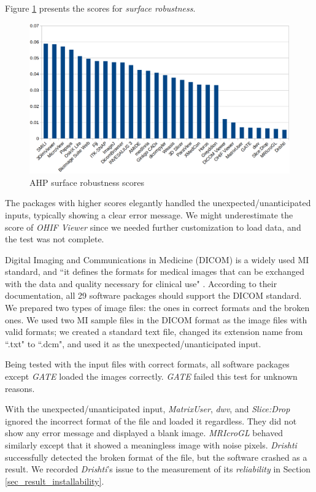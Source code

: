 \documentclass[3p, 12pt,authoryear]{elsarticle}
\begin{document}
Figure \ref{fg_robustness_scores} presents the scores for \textit{surface
robustness}.

\begin{figure}[ht]
\includegraphics[scale=0.38]{figures/robustness_scores.png}
\caption{AHP surface robustness scores}
\label{fg_robustness_scores}
\end{figure}

The packages with higher scores elegantly handled the unexpected/unanticipated
inputs, typically showing a clear error message. We might underestimate the
score of \textit{OHIF Viewer} since we needed further customization to load
data, and the test was not complete.

Digital Imaging and Communications in Medicine (DICOM) is a widely used MI
standard, and ``it defines the formats for medical images that can be exchanged
with the data and quality necessary for clinical use" \citep{MITA2021}. According
to their documentation, all 29 software packages should support the DICOM
standard. We prepared two types of image files: the ones in correct formats and
the broken ones. We used two MI sample files in the DICOM format as the image
files with valid formats; we created a standard text file, changed its extension
name from ``.txt" to ``.dcm", and used it as the unexpected/unanticipated input.

Being tested with the input files with correct formats, all software packages
except \textit{GATE} loaded the images correctly. \textit{GATE} failed this test
for unknown reasons.

With the unexpected/unanticipated input, \textit{MatrixUser}, \textit{dwv}, and
\textit{Slice:Drop} ignored the incorrect format of the file and loaded it
regardless. They did not show any error message and displayed a blank image.
\textit{MRIcroGL} behaved similarly except that it showed a meaningless image
with noise pixels. \textit{Drishti} successfully detected the broken format of
the file, but the software crashed as a result. We recorded \textit{Drishti}'s
issue to the measurement of its \textit{reliability} in Section
\ref{sec_result_installability}.
\end{document}
